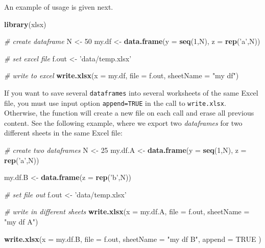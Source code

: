 \documentclass[11pt,]{book}
\newenvironment{Shaded}{\begin{snugshade}}{\end{snugshade}}
\newcommand{\KeywordTok}[1]{\textcolor[rgb]{0.27,0.27,0.27}{\textbf{#1}}}
\newcommand{\DataTypeTok}[1]{\textcolor[rgb]{0.27,0.27,0.27}{#1}}
\newcommand{\DecValTok}[1]{\textcolor[rgb]{0.06,0.06,0.06}{#1}}
\newcommand{\StringTok}[1]{\textcolor[rgb]{0.5,0.5,0.5}{#1}}
\newcommand{\CommentTok}[1]{\textcolor[rgb]{0.56,0.35,0.01}{\textit{#1}}}
\newcommand{\OtherTok}[1]{\textcolor[rgb]{0.56,0.35,0.01}{#1}}
\newcommand{\NormalTok}[1]{#1}
\begin{document}
An example of usage is given next.

\begin{Shaded}
\begin{Highlighting}[]
\KeywordTok{library}\NormalTok{(xlsx)}

\CommentTok{# create dataframe}
\NormalTok{N <-}\StringTok{ }\DecValTok{50}
\NormalTok{my.df <-}\StringTok{ }\KeywordTok{data.frame}\NormalTok{(}\DataTypeTok{y =} \KeywordTok{seq}\NormalTok{(}\DecValTok{1}\NormalTok{,N), }\DataTypeTok{z =} \KeywordTok{rep}\NormalTok{(}\StringTok{'a'}\NormalTok{,N))}

\CommentTok{# set excel file}
\NormalTok{f.out <-}\StringTok{ 'data/temp.xlsx'}

\CommentTok{# write to excel}
\KeywordTok{write.xlsx}\NormalTok{(}\DataTypeTok{x =}\NormalTok{ my.df, }\DataTypeTok{file =}\NormalTok{ f.out, }\DataTypeTok{sheetName =} \StringTok{"my df"}\NormalTok{)}
\end{Highlighting}
\end{Shaded}

If you want to save several \texttt{dataframes} into several worksheets
of the same Excel file, you must use input option \texttt{append=TRUE}
in the call to \texttt{write.xlsx}. Otherwise, the function will create
a new file on each call and erase all previous content. See the
following example, where we export two \emph{dataframes} for two
different sheets in the same Excel file: 

\begin{Shaded}
\begin{Highlighting}[]
\CommentTok{# create two dataframes}
\NormalTok{N <-}\StringTok{ }\DecValTok{25}
\NormalTok{my.df.A <-}\StringTok{ }\KeywordTok{data.frame}\NormalTok{(}\DataTypeTok{y =} \KeywordTok{seq}\NormalTok{(}\DecValTok{1}\NormalTok{,N), }
                      \DataTypeTok{z =} \KeywordTok{rep}\NormalTok{(}\StringTok{'a'}\NormalTok{,N))}

\NormalTok{my.df.B <-}\StringTok{ }\KeywordTok{data.frame}\NormalTok{(}\DataTypeTok{z =} \KeywordTok{rep}\NormalTok{(}\StringTok{'b'}\NormalTok{,N))}

\CommentTok{# set file out}
\NormalTok{f.out <-}\StringTok{ 'data/temp.xlsx'}

\CommentTok{# write in different sheets}
\KeywordTok{write.xlsx}\NormalTok{(}\DataTypeTok{x =}\NormalTok{ my.df.A, }
           \DataTypeTok{file =}\NormalTok{ f.out, }
           \DataTypeTok{sheetName =} \StringTok{"my df A"}\NormalTok{)}

\KeywordTok{write.xlsx}\NormalTok{(}\DataTypeTok{x =}\NormalTok{ my.df.B, }
           \DataTypeTok{file =}\NormalTok{ f.out, }
           \DataTypeTok{sheetName =} \StringTok{"my df B"}\NormalTok{, }
           \DataTypeTok{append =} \OtherTok{TRUE}\NormalTok{ )}
\end{Highlighting}
\end{Shaded}
\end{document}
